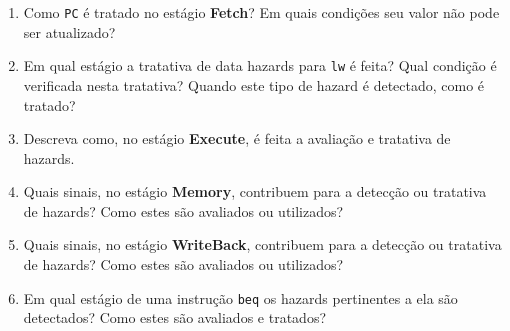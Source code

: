 \documentclass{article}
\begin{document}
\begin{enumerate}
\bigbreak

4 $\text{ALUOut}_\text{reg} \xrightarrow{\text{ALUOut}} \text{WD3}_\text{multiplexer} \xrightarrow{\text{ALUOut}} \text{WD3}_\text{RegFile}$,  $\text{CtrlUnit} \begin{matrix*}[l] 
\xrightarrow{\text{RegDst}} \text{RegDst}_\text{multiplexer} \\ \xrightarrow{\text{MemtoReg}} \text{WD3}_\text{multiplexer} \\ \xrightarrow{\text{RegWrite}} \text{RegFile} \end{matrix*}$\\


\begin{enumerate}
    \item sub
    \item jr
    \item jal
    \item beq
    \item sw
    \item lw
    \item addi
\end{enumerate}

Para as 8 seguintes questões, considere um processador pipeline que implemente todas as tratativas de hazards.

\item Como \verb|PC| é tratado no estágio \textbf{Fetch}? Em quais condições seu valor não pode ser atualizado?

\item Em qual estágio a tratativa de data hazards para \verb|lw| é feita? Qual condição é verificada nesta tratativa? Quando este tipo de hazard é detectado, como é tratado?

\item Descreva como, no estágio \textbf{Execute}, é feita a avaliação e tratativa de hazards.

\item Quais sinais, no estágio \textbf{Memory}, contribuem para a detecção ou tratativa de hazards? Como estes são avaliados ou utilizados?

\item Quais sinais, no estágio \textbf{WriteBack}, contribuem para a detecção ou tratativa de hazards? Como estes são avaliados ou utilizados?

\item Em qual estágio de uma instrução \verb|beq| os hazards pertinentes a ela são detectados? Como estes são avaliados e tratados?


\end{enumerate}
\end{document}
